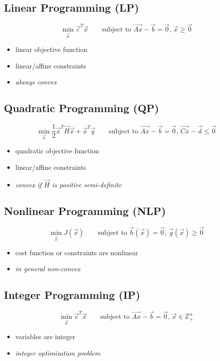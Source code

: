 \subsection{Linear Programming (LP)}
\begin{equation*}
\boxed{\min_{\vec x} \vec c^T \vec x \qquad \text{subject to }  \vec{Ax} - \vec{b} = \vec 0, \, \vec x \geq \vec 0}
\end{equation*}
\begin{itemize}
	\item linear objective function
	\item linear/affine constraints
	\item \emph{always convex}
\end{itemize}

\subsection{Quadratic Programming (QP)}
\begin{equation*}
\boxed{\min_{\vec x} \frac{1}{2} \vec x^T \vec H \vec x + \vec x^T \vec q\qquad \text{subject to } \vec{Ax} - \vec{b} = \vec 0, \, \vec{Cx} - \vec d \leq \vec 0}
\end{equation*}
\begin{itemize}
	\item quadratic objective function
	\item linear/affine constraints
	\item \emph{convex if $\vec H$ is positive semi-definite}
\end{itemize}

\subsection{Nonlinear Programming (NLP)}
\begin{equation*}
\boxed{\min_{\vec x} J(\vec x) \qquad \text{subject to } \vec{h}(\vec x) = \vec 0, \, \vec g(\vec x) \geq \vec 0}
\end{equation*}
\begin{itemize}
	\item cost function or constraints are nonlinear
	\item \emph{in general non-convex}
\end{itemize}

\subsection{Integer Programming (IP)}
\begin{equation*}
\boxed{\min_{\vec x} \vec c^T \vec x \qquad \text{subject to } \vec{Ax} - \vec{b} = \vec 0, \, \vec x \in \mathbb Z_{+}^n}
\end{equation*}
\begin{itemize}
	\item variables are integer
	\item \emph{integer optimization problem}
\end{itemize}

